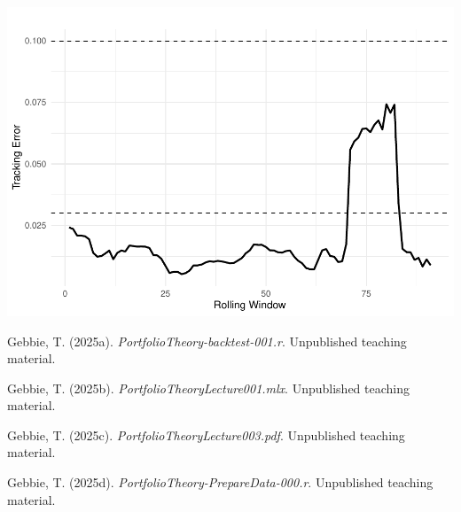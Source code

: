 \documentclass[
  12pt,
]{article}
\newlength{\cslhangindent}
\newenvironment{CSLReferences}[2] %
 {\begin{list}{}{%
  \setlength{\itemindent}{0pt}
  \setlength{\leftmargin}{0pt}
  \setlength{\parsep}{0pt}
  \ifodd #1
   \setlength{\leftmargin}{\cslhangindent}
   \setlength{\itemindent}{-1\cslhangindent}
  \fi
  \setlength{\itemsep}{#2\baselineskip}}}
 {\end{list}}
\begin{document}
\includegraphics{NDXNES005_A2_RMD_files/figure-latex/unnamed-chunk-12-1.pdf}

\newpage

\label{refs}
\begin{CSLReferences}{1}{0}
Gebbie, T. (2025a). \emph{PortfolioTheory-backtest-001.r}. Unpublished
teaching material.

Gebbie, T. (2025b). \emph{PortfolioTheoryLecture001.mlx}. Unpublished
teaching material.

Gebbie, T. (2025c). \emph{PortfolioTheoryLecture003.pdf}. Unpublished
teaching material.

Gebbie, T. (2025d). \emph{PortfolioTheory-PrepareData-000.r}.
Unpublished teaching material.

\end{CSLReferences}
\end{document}
